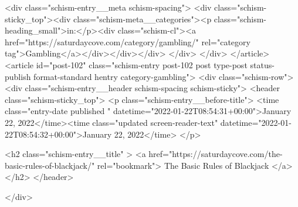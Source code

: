 {		<div class="schism-entry__meta schism-spacing">			<div class="schism-sticky_top"><div class="schism-meta__categories"><p class="schism-heading_small">in:</p><div class="schism-cl"><a href="https://saturdaycove.com/category/gambling/" rel="category tag">Gambling</a></div></div></div>		</div>
	</div>
</article>
<article id="post-102" class="schism-entry post-102 post type-post status-publish format-standard hentry category-gambling">
	<div class="schism-row">		<div class="schism-entry__header schism-spacing schism-sticky">			<header class="schism-sticky_top">				<p class="schism-entry__before-title">
					<time class="entry-date published " datetime="2022-01-22T08:54:31+00:00">January 22, 2022</time><time class="updated screen-reader-text" datetime="2022-01-22T08:54:32+00:00">January 22, 2022</time>				</p>

				<h2 class="schism-entry__title" >
					<a href="https://saturdaycove.com/the-basic-rules-of-blackjack/" rel="bookmark">
						The Basic Rules of Blackjack					</a>
				</h2>
			</header>

					</div>

}
